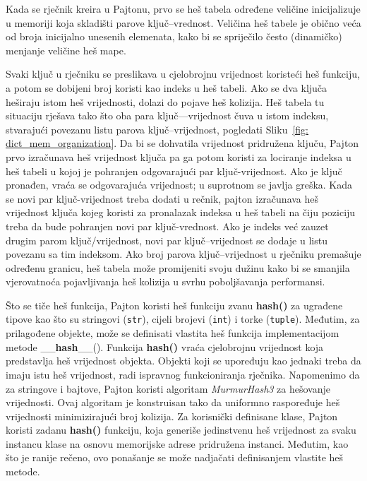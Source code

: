 	Kada se rječnik kreira u Pajtonu, prvo se heš tabela određene veličine  inicijalizuje u memoriji koja skladišti parove ključ--vrednost. Veličina heš tabele je obično veća od broja inicijalno unesenih elemenata, kako bi se spriječilo često (dinamičko) menjanje veličine heš mape.
	
	Svaki ključ u rječniku se preslikava u cjelobrojnu vrijednost koristeći heš funkciju, a potom se dobijeni broj koristi kao indeks u heš tabeli. Ako se dva ključa heširaju istom heš vrijednosti, dolazi do pojave heš kolizija. Heš tabela tu situaciju rješava tako što oba para ključ---vrijednost čuva u istom indeksu, stvarajući povezanu listu parova ključ--vrijednost, pogledati Sliku~\ref{fig: dict_mem_organization}. Da bi se dohvatila vrijednost pridružena ključu, Pajton prvo izračunava heš vrijednost ključa pa ga potom koristi za lociranje indeksa u heš tabeli u kojoj je pohranjen odgovarajući par ključ-vrijednost. Ako je ključ pronađen, vraća se odgovarajuća vrijednost; u suprotnom se javlja greška.  Kada se novi par ključ-vrijednost treba dodati u rečnik, pajton izračunava heš vrijednost ključa kojeg koristi za pronalazak  indeksa u heš tabeli na čiju poziciju treba da bude pohranjen novi par ključ-vrednost. Ako je indeks već zauzet drugim parom ključ/vrijednost, novi par ključ--vrijednost se dodaje u   listu povezanu sa tim indeksom. Ako broj parova ključ--vrijednost u rječniku premašuje određenu granicu, heš tabela može promijeniti svoju dužinu kako bi se smanjila vjerovatnoća pojavljivanja heš kolizija u svrhu poboljšavanja performansi.
	
	Što se tiče heš funkcija, Pajton koristi heš funkciju zvanu \textbf{hash()} za ugrađene tipove kao što su stringovi (\texttt{str}), cijeli brojevi (\texttt{int}) i torke (\texttt{tuple}). Međutim, za prilagođene objekte, može se definisati vlastita heš funkcija implementacijom metode \_\_\textbf{hash}\_\_(). Funkcija \textbf{hash()}  vraća cjelobrojnu vrijednost koja predstavlja heš vrijednost objekta. Objekti koji se upoređuju kao jednaki treba da imaju istu heš vrijednost, radi ispravnog funkcioniranja rječnika. Napomenimo da za stringove i bajtove, Pajton koristi algoritam \textit{MurmurHash3} za hešovanje vrijednosti. Ovaj algoritam je konstruisan tako da uniformno raspoređuje heš vrijednosti minimizirajući broj kolizija. Za korisnički definisane klase, Pajton koristi zadanu \textbf{hash()} funkciju, koja generiše jedinstvenu heš vrijednost za svaku instancu klase na osnovu memorijske adrese pridružena instanci. Međutim, kao što je ranije rečeno, ovo ponašanje se može nadjačati definisanjem vlastite heš metode. 
	
